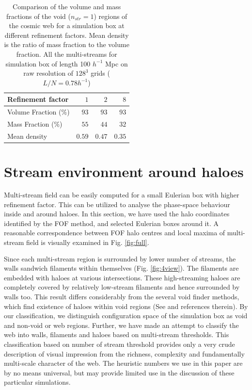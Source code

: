  \begin{table}
  \caption{Comparison of the volume and mass fractions of the void ($n_{str} = 1$) regions of the cosmic web for a simulation box at different refinement factors. Mean density is the ratio of mass fraction to the volume fraction. All the multi-streams for simulation box of length 100 $h^{-1}$ Mpc on raw resolution of $128^{3}$ grids ($ L/N = 0.78 h^{-1}$) }
\begin{tabular}{|l|r|r|r|}
\hline
Refinement factor               & $1$ & $2$& $8$   \\ \hline
Volume Fraction (\%)                 & $93$   & $93$    & $93$       \\ \hline
Mass Fraction   (\%)               & $55$   & $44$   & $32$           \\ \hline
Mean density                    & $0.59$ & $0.47$    & $0.35$        \\ \hline
\end{tabular}

 \label{tab:Compare_ref}
\end{table}



\section{Stream environment around haloes}
\label{sec:local}

Multi-stream field can be easily computed for a small Eulerian box with higher refinement factor. This can be utilized to analyse the phase-space behaviour inside and around haloes. In this section, 
we have used the halo coordinates identified by the FOF method, and selected Eulerian boxes around it. A reasonable  correspondence between FOF halo centres and local maxima of multi-stream field is visually examined in Fig. \ref{fig:full}. 

Since each multi-stream region is surrounded by lower number of streams, the walls sandwich filaments within themselves (Fig. \ref{fig:4view}). The filaments are embedded with haloes at various intersections. These high-streaming haloes are completely covered by relatively low-stream filaments and hence surrounded by walls too. This result differs considerably from the several void finder methods, which find existence of haloes within  void regions (See \citealt{Colberg2008} and references therein). By our classification, we distinguish configuration space of the simulation box as void and non-void or web regions. Further, we have made an attempt to classify the web into walls, filaments and haloes based on multi-stream thresholds. This classification based on number of stream threshold provides only a very crude description of visual impression from the richness, complexity and fundamentally multi-scale character of the web. The heuristic numbers we use in this paper are by no means universal, but may provide limited use in the discussion of these particular simulations.

